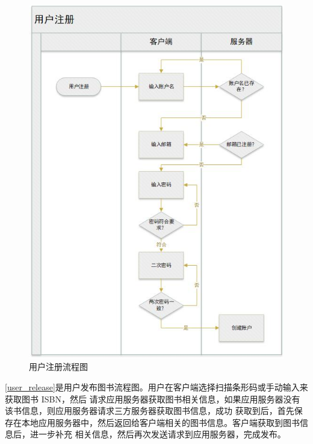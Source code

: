 \begin{figure}[h]
	\centering
	\includegraphics[scale=0.8]{Chapters/UML/user_register.jpg}
	\caption{用户注册流程图}
	\label{user_register}
\end{figure}

\cref{user_release}是用户发布图书流程图。用户在客户端选择扫描条形码或手动输入来获取图书 ISBN，然后
请求应用服务器获取图书相关信息，如果应用服务器没有该书信息，则应用服务器请求三方服务器获取图书信息，成功
获取到后，首先保存在本地应用服务器中，然后返回给客户端相关的图书信息。客户端获取到图书信息后，进一步补充
相关信息，然后再次发送请求到应用服务器，完成发布。

